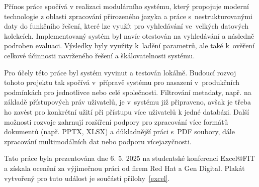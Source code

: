 Přínos práce spočívá v realizaci modulárního systému, který propojuje moderní technologie z oblasti zpracování přirozeného jazyka a práce s~nestrukturovanými daty do funkčního řešení, které lze využít pro vyhledávání ve~velkých datových kolekcích. Implementovaný systém byl navíc otestován na vyhledávání a následně podroben evaluaci. Výsledky byly využity k~ladění parametrů, ale také k~ověření celkové účinnosti navrženého řešení a škálovatelnosti systému.

Pro účely této práce byl systém vyvinut a testován lokálně. Budoucí rozvoj tohoto projektu tak spočívá v~přípravě systému pro nasazení v~produkčních podmínkách pro jednotlivce nebo celé společnosti. Filtrování metadaty, např. na základě přístupových práv uživatelů, je v~systému již připraveno, avšak je třeba ho zavést pro konkrétní užití při přístupu více uživatelů k jedné databázi. Další možnosti rozvoje zahrnují rozšíření podpory pro zpracování více formátů dokumentů (např. PPTX, XLSX) a důkladnější práci s~PDF soubory, dále zpracování multimodálních dat nebo podporu vícejazyčnosti. 

Tato práce byla prezentována dne 6. 5. 2025 na studentské konferenci Excel@FIT a získala ocenění za výjimečnou práci od firem Red Hat a Gen Digital. Plakát vytvořený pro tuto událost je součástí přílohy~\ref{excel}.


%